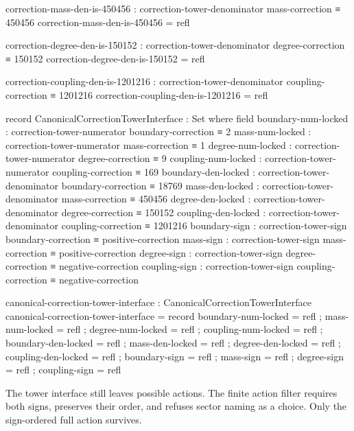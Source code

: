 \documentclass[11pt]{article}
\begin{document}
\begin{code}
correction-mass-den-is-450456 :
  correction-tower-denominator mass-correction ≡ 450456
correction-mass-den-is-450456 = refl

correction-degree-den-is-150152 :
  correction-tower-denominator degree-correction ≡ 150152
correction-degree-den-is-150152 = refl

correction-coupling-den-is-1201216 :
  correction-tower-denominator coupling-correction ≡ 1201216
correction-coupling-den-is-1201216 = refl

record CanonicalCorrectionTowerInterface : Set where
  field
    boundary-num-locked : correction-tower-numerator boundary-correction ≡ 2
    mass-num-locked     : correction-tower-numerator mass-correction ≡ 1
    degree-num-locked   : correction-tower-numerator degree-correction ≡ 9
    coupling-num-locked : correction-tower-numerator coupling-correction ≡ 169
    boundary-den-locked : correction-tower-denominator boundary-correction ≡ 18769
    mass-den-locked     : correction-tower-denominator mass-correction ≡ 450456
    degree-den-locked   : correction-tower-denominator degree-correction ≡ 150152
    coupling-den-locked : correction-tower-denominator coupling-correction ≡ 1201216
    boundary-sign       : correction-tower-sign boundary-correction ≡ positive-correction
    mass-sign           : correction-tower-sign mass-correction ≡ positive-correction
    degree-sign         : correction-tower-sign degree-correction ≡ negative-correction
    coupling-sign       : correction-tower-sign coupling-correction ≡ negative-correction

canonical-correction-tower-interface : CanonicalCorrectionTowerInterface
canonical-correction-tower-interface = record
  { boundary-num-locked = refl
  ; mass-num-locked     = refl
  ; degree-num-locked   = refl
  ; coupling-num-locked = refl
  ; boundary-den-locked = refl
  ; mass-den-locked     = refl
  ; degree-den-locked   = refl
  ; coupling-den-locked = refl
  ; boundary-sign       = refl
  ; mass-sign           = refl
  ; degree-sign         = refl
  ; coupling-sign       = refl
  }
\end{code}

The tower interface still leaves possible actions.  The finite action filter
requires both signs, preserves their order, and refuses sector naming as a
choice.  Only the sign-ordered full action survives.
\end{document}
